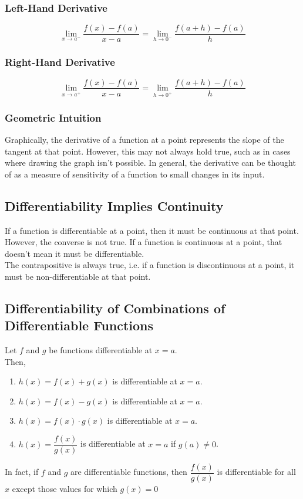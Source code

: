 \documentclass[14]{article}
\theoremstyle{definition}
\begin{document}
\subsubsection{Left-Hand Derivative}
\[\lim\limits_{x \to a^-} \dfrac{f(x) - f(a)}{x-a} = \lim\limits_{h \to 0^-} \dfrac{f(a + h) - f(a)}{h} \]
\subsubsection{Right-Hand Derivative}
\[\lim\limits_{x \to a^+} \dfrac{f(x) - f(a)}{x-a} = \lim\limits_{h \to 0^+} \dfrac{f(a + h) - f(a)}{h} \]
\subsubsection{Geometric Intuition}
Graphically, the derivative of a function at a point represents the slope of the tangent at that point. However, this may not always hold true, such as in cases where drawing the graph isn't possible. In general, the derivative can be thought of as a measure of sensitivity of a function to small changes in its input.
\subsection{Differentiability Implies Continuity}
If a function is differentiable at a point, then it must be continuous at that point.\\
However, the converse is not true. If a function is continuous at a point, that doesn't mean it must be differentiable.\\
The contrapositive is always true, i.e. if a function is discontinuous at a point, it must be non-differentiable at that point.
\subsection{Differentiability of Combinations of Differentiable Functions}
Let $f$ and $g$ be functions differentiable at $x = a$.\\
Then,\\
\begin{enumerate}
\item $h(x) = f(x) + g(x)$ is differentiable at $x = a$.
\item $h(x) = f(x) - g(x)$ is differentiable at $x = a$.
\item $h(x) = f(x) \cdot g(x)$ is differentiable at $x = a$.
\item $h(x) =\dfrac{f(x)}{g(x)}$ is differentiable at $x = a$ if $g(a) \neq 0$.
\end{enumerate}
In fact, if $f$ and $g$ are differentiable functions, then $\dfrac{f(x)}{g(x)}$ is differentiable for all $x$ except those values for which $g(x)=0$
\pagebreak
\end{document}
